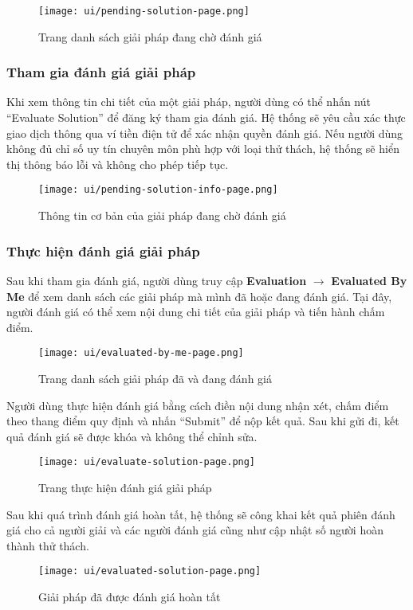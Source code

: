 \begin{figure}[H]
  \centering
  \texttt{[image: ui/pending-solution-page.png]}
  \caption{Trang danh sách giải pháp đang chờ đánh giá}
  \label{fig:pending-solution-page}
\end{figure}

\subsubsection{Tham gia đánh giá giải pháp}

Khi xem thông tin chi tiết của một giải pháp, người dùng có thể nhấn nút ``Evaluate Solution'' để đăng ký tham gia đánh giá.  
Hệ thống sẽ yêu cầu xác thực giao dịch thông qua ví tiền điện tử để xác nhận quyền đánh giá.
Nếu người dùng không đủ chỉ số uy tín chuyên môn phù hợp với loại thử thách, hệ thống sẽ hiển thị thông báo lỗi và không cho phép tiếp tục.

\begin{figure}[H]
  \centering
  \texttt{[image: ui/pending-solution-info-page.png]}
  \caption{Thông tin cơ bản của giải pháp đang chờ đánh giá}
  \label{fig:pending-solution-info-page}
\end{figure}

\subsubsection{Thực hiện đánh giá giải pháp}

Sau khi tham gia đánh giá, người dùng truy cập \textbf{Evaluation} $\rightarrow$ \textbf{Evaluated By Me} để xem danh sách các giải pháp mà mình đã hoặc đang đánh giá.  
Tại đây, người đánh giá có thể xem nội dung chi tiết của giải pháp và tiến hành chấm điểm.

\begin{figure}[H]
  \centering
  \texttt{[image: ui/evaluated-by-me-page.png]}
  \caption{Trang danh sách giải pháp đã và đang đánh giá}
  \label{fig:evaluated-by-me-page}
\end{figure}

Người dùng thực hiện đánh giá bằng cách điền nội dung nhận xét, chấm điểm theo thang điểm quy định và nhấn ``Submit'' để nộp kết quả.  
Sau khi gửi đi, kết quả đánh giá sẽ được khóa và không thể chỉnh sửa.

\begin{figure}[H]
  \centering
  \texttt{[image: ui/evaluate-solution-page.png]}
  \caption{Trang thực hiện đánh giá giải pháp}
  \label{fig:evaluate-solution-page}
\end{figure}

Sau khi quá trình đánh giá hoàn tất, hệ thống sẽ công khai kết quả phiên đánh giá cho cả người giải và các người đánh giá cũng như cập nhật số người hoàn thành thử thách. 

\begin{figure}[H]
  \centering
  \texttt{[image: ui/evaluated-solution-page.png]}
  \caption{Giải pháp đã được đánh giá hoàn tất}
  \label{fig:evaluated-solution-page}
\end{figure}